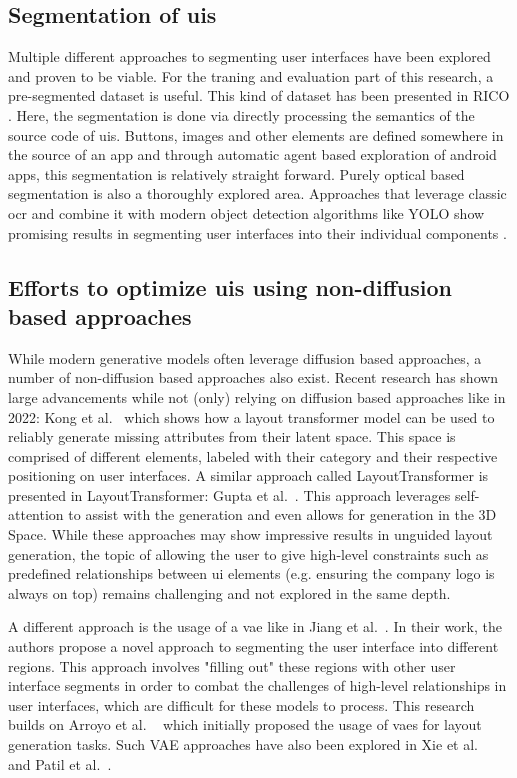 \documentclass[10pt,a4paper]{scrartcl} %
\begin{document}
\subsection{Segmentation of \acp{ui}}
Multiple different approaches to segmenting user interfaces have been explored and proven to be viable. For the traning and evaluation part of this research, a pre-segmented dataset is useful. This kind of dataset has been presented in RICO \cite{10.1145/3126594.3126651}. Here, the segmentation is done via directly processing the semantics of the source code of \acp{ui}. Buttons, images and other elements are defined somewhere in the source of an app and through automatic agent based exploration of android apps, this segmentation is relatively straight forward.
Purely optical based segmentation is also a thoroughly explored area. Approaches that leverage classic \ac{ocr} and combine it with modern object detection algorithms like YOLO \cite{Terven_2023} show promising results in segmenting user interfaces into their individual components \cite{10.1145/3368089.3409691}.

\subsection{Efforts to optimize \acp{ui} using non-diffusion based approaches}
While modern generative models often leverage diffusion based approaches, a number of non-diffusion based approaches also exist. Recent research has shown large advancements while not (only) relying on diffusion based approaches like in 2022: Kong et al.~\cite{kong2022blt} which shows how a layout transformer model can be used to reliably generate missing attributes from their latent space. This space is comprised of different elements, labeled with their category and their respective positioning on user interfaces.
A similar approach called LayoutTransformer is presented in LayoutTransformer: Gupta et al.~\cite{gupta2021layouttransformer}. This approach leverages self-attention to assist with the generation and even allows for generation in the 3D Space.
While these approaches may show impressive results in unguided layout generation, the topic of allowing the user to give high-level constraints such as predefined relationships between \ac{ui} elements (e.g. ensuring the company logo is always on top) remains challenging and not explored in the same depth.

A different approach is the usage of a \ac{vae} like in Jiang et al.~\cite{Jiang_Sun_Zhu_Lou_Zhang_2022}. In their work, the authors propose a novel approach to segmenting the user interface into different regions. This approach involves "filling out" these regions with other user interface segments in order to combat the challenges of high-level relationships in user interfaces, which are difficult for these models to process. This research builds on Arroyo et al. ~\cite{arroyo2021variational} which initially proposed the usage of \acp{vae} for layout generation tasks. Such VAE approaches have also been explored in Xie et al.~\cite{xie2021canvasemb} and Patil et al.~\cite{patil2020read}.
\end{document}
